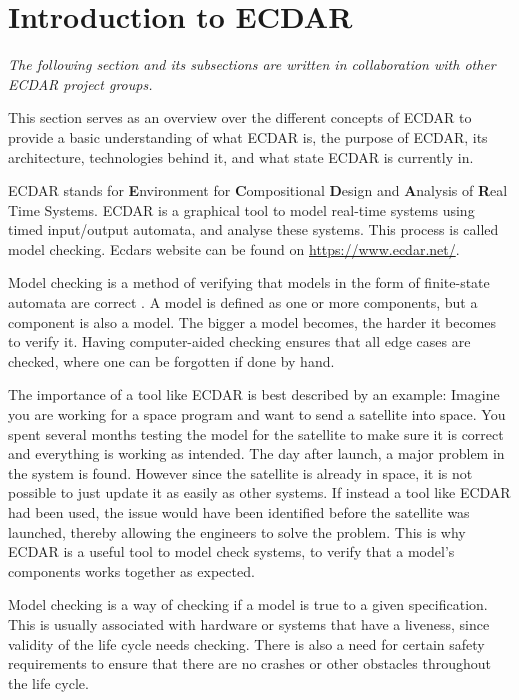 \section{Introduction to ECDAR}\label{sec:introduction-to-ecdar}
\textit{The following section and its subsections are written in collaboration with other ECDAR project groups.}\vspace{1em}

This section serves as an overview over the different concepts of ECDAR to provide a basic understanding of what ECDAR is, the purpose of ECDAR, its architecture, technologies behind it, and what state ECDAR is currently in.

ECDAR stands for \textbf{E}nvironment for \textbf{C}ompositional \textbf{D}esign and \textbf{A}nalysis of \textbf{R}eal Time Systems.
ECDAR is a graphical tool to model real-time systems using timed input/output automata, and analyse these systems. 
This process is called model checking. Ecdars website can be found on \href{https://www.ecdar.net/}{https://www.ecdar.net/}.

Model checking is a method of verifying that models in the form of finite-state automata are correct \cite{modelchecking-handbook}. A model is defined as one or more components, but a component is also a model.
The bigger a model becomes, the harder it becomes to verify it. 
Having computer-aided checking ensures that all edge cases are checked, where one can be forgotten if done by hand.
 
The importance of a tool like ECDAR is best described by an example:
Imagine you are working for a space program and want to send a satellite into space.
You spent several months testing the model for the satellite to make sure it is correct and everything is working as intended.
The day after launch, a major problem in the system is found. However since the satellite is already in space, it is not possible to just update it as easily as other systems. If instead a tool like ECDAR had been used, the issue would have been identified before the satellite was launched, thereby allowing the engineers to solve the problem.
This is why ECDAR is a useful tool to model check systems, to verify that a model's components works together as expected.

Model checking is a way of checking if a model is true to a given specification.
This is usually associated with hardware or systems that have a liveness, since validity of the life cycle needs checking.
There is also a need for certain safety requirements to ensure that there are no crashes or other obstacles throughout the life cycle.

